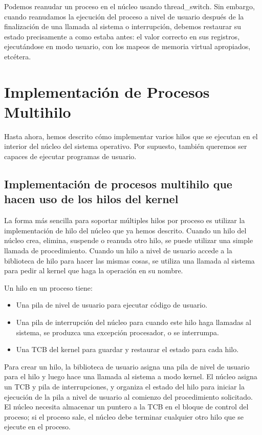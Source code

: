 \documentclass[10pt]{book}
\begin{document}
Podemos reanudar un proceso en el núcleo usando {\mf thread\_switch}. Sin embargo, cuando reanudamos la ejecución del proceso a nivel de usuario después de la finalización de una llamada al sistema o interrupción, debemos restaurar su estado precisamente a como estaba antes: el valor correcto en sus registros, ejecutándose en modo usuario, con los mapeos  de memoria virtual apropiados, etcétera.

\section{Implementación de Procesos Multihilo}
Hasta ahora, hemos descrito cómo implementar varios hilos que se ejecutan en el interior del núcleo del sistema operativo. Por supuesto, también queremos ser capaces de ejecutar programas de usuario.

\subsection{Implementación de procesos multihilo que hacen uso de los hilos del kernel}
La forma más sencilla para soportar múltiples hilos por proceso es utilizar la implementación de hilo del núcleo que ya hemos descrito. Cuando un hilo del núcleo crea, elimina, suspende o reanuda otro hilo, se puede utilizar una simple llamada de procedimiento. Cuando un hilo a nivel de usuario accede a la biblioteca de hilo para hacer las mismas cosas, se utiliza una llamada al sistema para pedir al kernel que haga la operación en su nombre.

Un hilo en un proceso tiene:
\begin{itemize}
\item Una pila de nivel de usuario para ejecutar código de usuario.
\item Una pila de interrupción del núcleo para cuando este hilo haga llamadas al sistema, se produzca una excepción procesador, o se interrumpa.
\item Una TCB del kernel para guardar y restaurar el estado para cada hilo.
\end{itemize}

Para crear un hilo, la biblioteca de usuario asigna una pila de nivel de usuario para el hilo y luego hace una llamada al sistema a modo kernel. El núcleo asigna un TCB y pila de interrupciones, y organiza el estado del hilo para iniciar la ejecución de la pila a nivel de usuario al comienzo del procedimiento solicitado. El núcleo necesita almacenar un puntero a la TCB en el bloque de control del proceso; si el proceso sale, el núcleo debe terminar cualquier otro hilo que se ejecute en el proceso.
\end{document}
